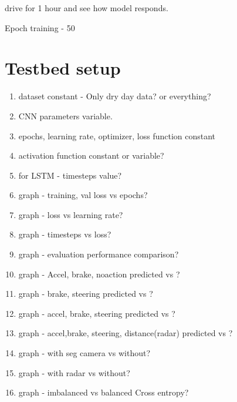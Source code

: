 drive for 1 hour and see how model responds.

Epoch training - 50
\section{Testbed setup}

\begin{enumerate}
    \item dataset constant - Only dry day data?
        or everything?
    \item CNN parameters variable.
    \item epochs, learning rate, optimizer, loss function constant
    \item activation function constant or variable?
    \item for LSTM - timesteps value?
    \item graph - training, val loss vs epochs?
    \item graph - loss vs learning rate?
    \item graph - timesteps vs loss?
    \item graph - evaluation performance comparison?
    \item graph - Accel, brake, noaction predicted vs ?
    \item graph - brake, steering predicted vs ?
    \item graph - accel, brake, steering predicted vs ?
    \item graph - accel,brake, steering, distance(radar) predicted vs ?
    \item graph - with seg camera vs without?
    \item graph - with radar vs without?
    \item graph - imbalanced vs balanced Cross entropy?


\end{enumerate}
